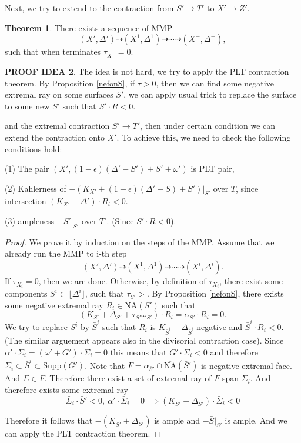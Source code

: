 \documentclass[11pt]{article}
\theoremstyle{definition}
\newtheorem{theorem}{Theorem}
\newtheorem{proofidea}[theorem]{PROOF IDEA}
\begin{document}
	
	Next, we try to extend to the contraction from $S'\to T'$ to $X'\to Z'$.
	
	\begin{theorem}
		There exists a sequence of MMP $$(X',\Delta' )\dashrightarrow (X^1, \Delta ^1 )\dashrightarrow \cdots \dashrightarrow (X^+ ,\Delta ^+),$$such that when terminates $\tau_{X^+} = 0$.
	\end{theorem}
	\begin{proofidea}
		The idea is not hard, we try to apply the PLT contraction theorem. By Proposition \ref{nefonS}, if $\tau>0$, then we can find some negative extremal ray on some surfaces $S'$, we can apply usual trick to replace the surface to some new $S'$ such that $S' \cdot R <0$.  
		
		and the extremal contraction $S'\to T'$, then under certain condition we can extend the contraction onto $X'$. To achieve this, we need to check the following conditions hold:
		
		(1) The pair $(X', (1-\epsilon)(\Delta' - S')+ S' + \omega')$ is PLT pair,
		
		(2) Kahlerness of $-(K_{X'}+(1-\epsilon)(\Delta' - S)+ S' )|_{S'} $ over $T$, since intersection $(K_{X'} + \Delta')\cdot R_i <0$.
		
		(3) ampleness $-S'|_{S'}$ over $T'$. (Since $S'\cdot R <0$). 
		
	\end{proofidea}
	\begin{proof}
		We prove it by induction on the steps of the MMP. Assume that we already run the MMP to i-th step $$(X',\Delta ') \dashrightarrow (X^1, \Delta^1)\dashrightarrow \cdots \dashrightarrow (X^i, \Delta^i).$$
		If $\tau_{X_i} = 0$, then we are done. Otherwise, by definition of $\tau_{X_i}$, there exist some components $S^i \subset \lfloor{\Delta^i}\rfloor$, such that $\tau_{S'} >$. By Proposition \ref{nefonS}, there exists some negative extremal ray $R_i\in \overline{\text{NA}}(S')$ such that $$(K_{S'}+ \Delta_{S'} + \tau_{S'} \omega_{S'}) \cdot R_i = \alpha_{S'}\cdot R_i  = 0.$$ 
		We try to replace $S^i$ by $\bar{S}^i$ such that $R_i$ is $K_{\bar{S}^i} + \Delta_{\bar{S}^i}$-negative and $\bar{S}^i \cdot R_i  <0$. (The similar arguement appears also in the divisorial contraction case). Since $\alpha'  \cdot \Sigma_i  = (\omega' + G')\cdot \Sigma_i= 0$ this means that $G' \cdot \Sigma_i <0$ and therefore $\Sigma_i \subset \bar{S}^i \subset \text{Supp} (G')$. Note that $F = \alpha_{\bar{S}'}\cap \overline{\text{NA}}(\bar{S}')$ is negative extremal face. And $\Sigma \in F$. Therefore there exist a set of extremal ray of $F$ span $\Sigma_i$. And therefore exists some extremal ray $$\bar{\Sigma}_i\cdot \bar{S}'<0,\  \alpha' \cdot \bar{\Sigma}_i =0\implies (K_{\bar{S}'}+\Delta_{\bar{S}'})\cdot \bar{\Sigma}_i <0$$
		
		Therefore it follows that $-(K_{\bar{S'}}+ \Delta_{\bar{S}'})$ is ample and $-\bar{S}|_{\bar{S}'}$ is ample. And we can apply the PLT contraction theorem. 
		
		
		
	\end{proof}
	
\end{document}
